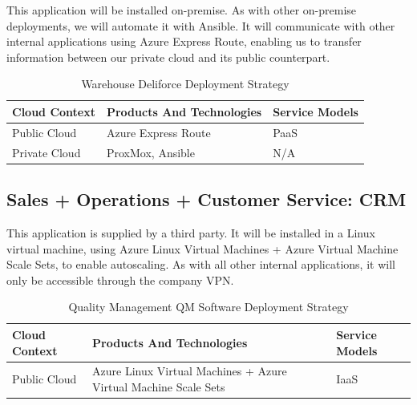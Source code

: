 \documentclass{llncs}
\begin{document}
This application will be installed on-premise. As with other on-premise deployments, we will automate it with Ansible.
It will communicate with other internal applications using Azure Express Route, enabling us to transfer information between our private cloud and its public counterpart.\\

\begin{table}[h!]
    \centering
    \begin{tabular}{lll}
        \hline
        \textbf{Cloud Context} & \textbf{Products And Technologies} & \textbf{Service Models} \\
        \hline
        Public Cloud           & Azure Express Route                & PaaS                    \\
        \hline
        Private Cloud          & ProxMox, Ansible                   & N/A                     \\
        \hline
    \end{tabular}
    \caption{Warehouse Deliforce Deployment Strategy}
\end{table}

\subsection{Sales + Operations + Customer Service: CRM}

This application is supplied by a third party. It will be installed in a Linux virtual machine, using Azure Linux Virtual Machines + Azure Virtual Machine Scale Sets, to enable autoscaling.
As with all other internal applications, it will only be accessible through the company VPN.\\

\begin{table}[h!]
    \centering
    \begin{tabular}{lll}
        \hline
        \textbf{Cloud Context} & \textbf{Products And Technologies}                              & \textbf{Service Models} \\
        \hline
        Public Cloud           & Azure Linux Virtual Machines + Azure Virtual Machine Scale Sets & IaaS                    \\
    \end{tabular}
    \caption{Quality Management QM Software Deployment Strategy}
\end{table}
\end{document}
